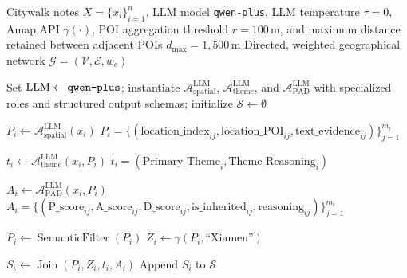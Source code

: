 \documentclass[11pt]{article}
\newcommand{\AgentSpatial}{\mathcal{A}_{\mathrm{spatial}}}
\newcommand{\AgentTheme}{\mathcal{A}_{\mathrm{theme}}}
\newcommand{\AgentPAD}{\mathcal{A}_{\mathrm{PAD}}}
\begin{document}
\pagestyle{empty}

\begin{algorithm}[H]
\caption{LLM multi-agent workflow for constructing the Citywalk
mobility-theme-affect network}
\label{alg:three-agent-workflow}
\small
\begin{algorithmic}[1]
\setlength{\itemsep}{1.5pt}
\Require Citywalk notes \(X=\{x_i\}_{i=1}^{n}\), LLM model
\texttt{qwen-plus}, LLM temperature \(\tau=0\), Amap API
\(\gamma(\cdot)\), POI aggregation threshold \(r=100\,\mathrm{m}\), and
maximum distance retained between adjacent POIs
\(d_{\max}=1{,}500\,\mathrm{m}\)
\Ensure Directed, weighted geographical network
\(\mathcal{G}=(\mathcal{V},\mathcal{E},w_e)\)

\State Set \(\mathrm{LLM}\gets\text{\texttt{qwen-plus}}\); instantiate
\(\AgentSpatial^{\mathrm{LLM}}\),
\(\AgentTheme^{\mathrm{LLM}}\), and \(\AgentPAD^{\mathrm{LLM}}\) with
specialized roles and structured output schemas; initialize
\(\mathcal{S}\gets\emptyset\)

    \State \(P_i\gets\AgentSpatial^{\mathrm{LLM}}(x_i)\)
    \Statex \hspace{\algorithmicindent}
    \(P_i=\{(\mathrm{location\_index}_{ij},
    \mathrm{location\_POI}_{ij},
    \mathrm{text\_evidence}_{ij})\}_{j=1}^{m_i}\)

    \State \(t_i\gets\AgentTheme^{\mathrm{LLM}}(x_i,P_i)\)
    \Statex \hspace{\algorithmicindent}
    \(t_i=(\mathrm{Primary\_Theme}_i,
    \mathrm{Theme\_Reasoning}_i)\)

    \State \(A_i\gets\AgentPAD^{\mathrm{LLM}}(x_i,P_i)\)
    \Statex \hspace{\algorithmicindent}
    \(A_i=\{(\mathrm{P\_score}_{ij},
    \mathrm{A\_score}_{ij},\mathrm{D\_score}_{ij},
    \mathrm{is\_inherited}_{ij},
    \mathrm{reasoning}_{ij})\}_{j=1}^{m_i}\)

    \State \(P_i\gets\operatorname{SemanticFilter}(P_i)\)
    \State \(Z_i\gets\gamma(P_i,\text{``Xiamen''})\)

    \State \(S_i\gets
    \operatorname{Join}(P_i,Z_i,t_i,A_i)\)
    \State Append \(S_i\) to \(\mathcal{S}\)
\EndFor


\end{algorithmic}
\end{algorithm}
\end{document}
